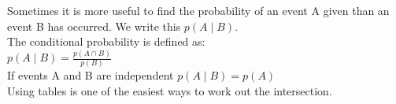 \documentclass[class=article, crop=false]{standalone}
\begin{document}
Sometimes it is more useful to find the probability of an event A given than an event B has occurred. We write this $p(A \mid B)$. \\
The conditional probability is defined as: \\
$p(A \mid B) = \frac{p(A \cap B)}{p(B)}$ \\
If events A and B are independent $p(A \mid B) = p(A)$ \\
Using tables is one of the easiest ways to work out the intersection.
\end{document}
